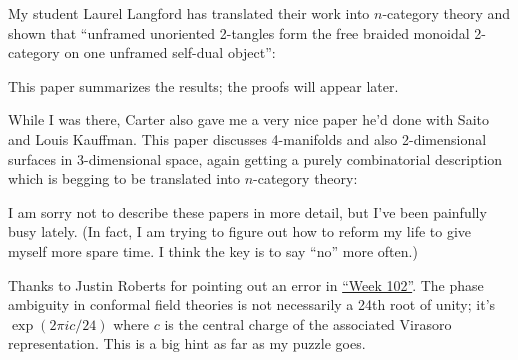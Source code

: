 \documentclass{article}
\def\tightlist{}
\renewcommand{\texttt}[1]{%
  \begingroup
  \ttfamily
  \begingroup\lccode`~=`/\lowercase{\endgroup\def~}{/\discretionary{}{}{}}%
  \begingroup\lccode`~=`[\lowercase{\endgroup\def~}{[\discretionary{}{}{}}%
  \begingroup\lccode`~=`.\lowercase{\endgroup\def~}{.\discretionary{}{}{}}%
  \catcode`/=\active\catcode`[=\active\catcode`.=\active
  \scantokens{#1\noexpand}%
  \endgroup
}
\begin{document}

My student Laurel Langford has translated their work into \(n\)-category
theory and shown that ``unframed unoriented 2-tangles form the free
braided monoidal 2-category on one unframed self-dual object'':


This paper summarizes the results; the proofs will appear later.

While I was there, Carter also gave me a very nice paper he'd done with
Saito and Louis Kauffman. This paper discusses 4-manifolds and also
2-dimensional surfaces in 3-dimensional space, again getting a purely
combinatorial description which is begging to be translated into
\(n\)-category theory:


I am sorry not to describe these papers in more detail, but I've been
painfully busy lately. (In fact, I am trying to figure out how to reform
my life to give myself more spare time. I think the key is to say ``no''
more often.)

Thanks to Justin Roberts for pointing out an error in
\protect\hyperlink{week102}{``Week 102''}. The phase ambiguity in
conformal field theories is not necessarily a 24th root of unity; it's
\(\exp(2\pi ic/24)\) where \(c\) is the central charge of the associated
Virasoro representation. This is a big hint as far as my puzzle goes.
\end{document}
